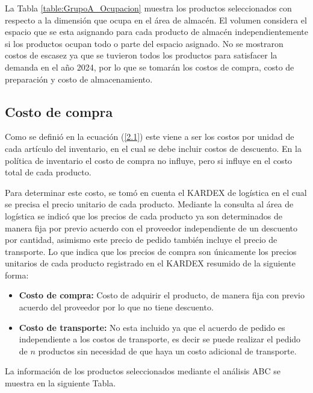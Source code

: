 La Tabla \ref{table:GrupoA_Ocupacion} muestra los productos seleccionados con respecto a la dimensión que ocupa en el área de almacén. El volumen considera el espacio que se esta asignando para cada producto de almacén independientemente si los productos ocupan todo o parte del espacio asignado. No se mostraron costos de escasez ya que se tuvieron todos los productos para satisfacer la demanda en el año 2024, por lo que se tomarán los costos de compra, costo de preparación y costo de almacenamiento.

\subsection{Costo de compra}
Como se definió en la ecuación (\ref{2.1}) este viene a ser los costos por unidad de cada artículo del inventario, en el cual se debe incluir costos de descuento. En la política de inventario el costo de compra no influye, pero si influye en el costo total de cada producto.

Para determinar este costo, se tomó en cuenta el KARDEX de logística en el cual se precisa el precio unitario de cada producto. Mediante la consulta al área de logística se indicó que los precios de cada producto ya son determinados de manera fija por previo acuerdo con el proveedor independiente de un descuento por cantidad, asimismo este precio de pedido también incluye el precio de transporte. Lo que indica que los precios de compra son únicamente los precios unitarios de cada producto registrado en el KARDEX resumido de la siguiente forma:
\begin{itemize}
\item \textbf{Costo de compra:} Costo de adquirir el producto, de manera fija con previo acuerdo del proveedor por lo que no tiene descuento.
\item \textbf{Costo de transporte:} No esta incluido ya que el acuerdo de pedido es independiente a los costos de transporte, es decir se puede realizar el pedido de $n$ productos sin necesidad de que haya un costo adicional de transporte.
\end{itemize}

La información de los productos seleccionados mediante el análisis ABC se muestra en la siguiente Tabla.

